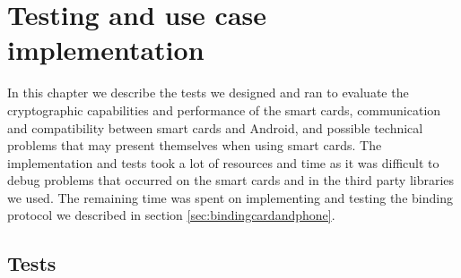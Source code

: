 \chapter{Testing and use case implementation}
\label{ch:testing}
In this chapter we describe the tests we designed and ran to evaluate the cryptographic capabilities and performance of the smart cards, communication and compatibility between smart cards and Android, and possible technical problems that may present themselves when using smart cards. The implementation and tests took a lot of resources and time as it was difficult to debug problems that occurred on the smart cards and in the third party libraries we used. The remaining time was spent on implementing and testing the binding protocol we described in section \ref{sec:bindingcardandphone}.



\section{Tests}





